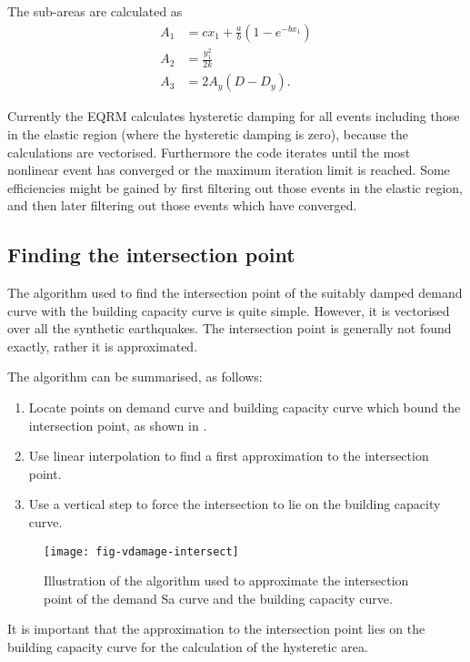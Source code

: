 The sub-areas are calculated as
\begin{align*}
 A_1 &= cx_1+\frac{a}{b}(1-e^{-bx_1})\\
 A_2 &= \frac{y_1^2}{2k}\\
 A_3 &= 2A_y(D-D_y).
\end{align*}

Currently the EQRM calculates
hysteretic damping for all events including those in the elastic
region (where the hysteretic damping is zero), because the
calculations are vectorised. Furthermore the code iterates until
the most nonlinear event has converged or the maximum iteration
limit is reached. Some efficiencies might be gained by first
filtering out those events in the elastic region, and then later
filtering out those events which have converged.


\subsection{Finding the intersection point}

The algorithm used to find the intersection point of the suitably
damped demand curve with the building capacity
curve is quite simple. However, it is
vectorised over all the synthetic earthquakes. The intersection
point is generally not found exactly, rather it is approximated.

The algorithm can be summarised, as follows:
\begin{enumerate}
\item Locate points on demand curve and
building capacity curve which bound the
intersection point, as shown in .
\item Use linear interpolation to find a first approximation to
the
  intersection point.
\item Use a vertical step to force the intersection to lie on the
  building capacity curve.
\end{enumerate}


\begin{figure}[htp]
\centering
\texttt{[image: fig-vdamage-intersect]}
\caption{Illustration of the algorithm used to approximate the
intersection point of the demand Sa curve and the building
capacity curve.}
\label{fig:vdamage-intersection}
\end{figure}

It is important that the approximation to the intersection point
lies on the building capacity curve for the
calculation of the hysteretic area.

